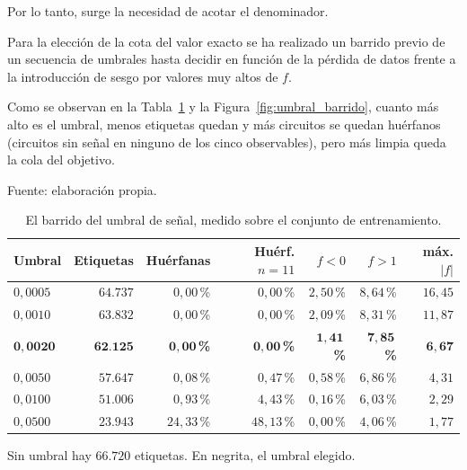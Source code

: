 Por lo tanto, surge la necesidad de acotar el denominador.

Para la elección de la cota del valor exacto se ha realizado un barrido previo de un secuencia de umbrales hasta decidir en función de la pérdida de datos frente a la introducción de sesgo por valores muy altos de $f$.

Como se observan en la Tabla~\ref{tab:barrido} y la Figura~\ref{fig:umbral_barrido}, cuanto más alto es el umbral, menos etiquetas quedan y más circuitos se quedan huérfanos (circuitos sin señal en ninguno de los cinco observables), pero más limpia queda la cola del objetivo.

\begin{table}[htbp]
    \centering
    \caption{El barrido del umbral de señal, medido sobre el conjunto de entrenamiento.}
    \label{tab:barrido}
    {\footnotesize
    Fuente: elaboración propia. \begin{tabular}{@{}lrrrrrr@{}}
        \toprule
        \textbf{Umbral} & \textbf{Etiquetas} & \textbf{Huérfanas}
            & \textbf{Huérf. $n{=}11$} & \textbf{$f<0$} & \textbf{$f>1$}
            & \textbf{máx. $|f|$} \\
        \midrule
        $0{,}0005$ & $64{.}737$ & $0{,}00$\,\% & $0{,}00$\,\% & $2{,}50$\,\% & $8{,}64$\,\% & $16{,}45$ \\
        $0{,}0010$ & $63{.}832$ & $0{,}00$\,\% & $0{,}00$\,\% & $2{,}09$\,\% & $8{,}31$\,\% & $11{,}87$ \\
        $\bm{0{,}0020}$ & $\bm{62{.}125}$ & $\bm{0{,}00}$\textbf{\,\%} & $\bm{0{,}00}$\textbf{\,\%}
                        & $\bm{1{,}41}$\textbf{\,\%} & $\bm{7{,}85}$\textbf{\,\%} & $\bm{6{,}67}$ \\
        $0{,}0050$ & $57{.}647$ & $0{,}08$\,\% & $0{,}47$\,\% & $0{,}58$\,\% & $6{,}86$\,\% & $4{,}31$ \\
        $0{,}0100$ & $51{.}006$ & $0{,}93$\,\% & $4{,}43$\,\% & $0{,}16$\,\% & $6{,}03$\,\% & $2{,}29$ \\
        $0{,}0500$ & $23{.}943$ & $24{,}33$\,\% & $48{,}13$\,\% & $0{,}00$\,\% & $4{,}06$\,\% & $1{,}77$ \\
        \bottomrule
    \end{tabular}}

    {\footnotesize Sin umbral hay $66{.}720$ etiquetas. En negrita,
    el umbral elegido.}
\end{table}

